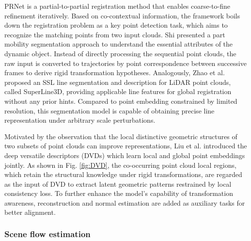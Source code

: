 \documentclass[a4paper,fleqn]{cas-dc}
\begin{document}
PRNet \citep{wang2019prnet} is a partial-to-partial registration method that enables coarse-to-fine refinement iteratively. Based on co-contextual information, the framework boils down the registration problem as a key point detection task, which aims to recognize the matching points from two input clouds. Shi \citep{wang2019prnet} presented a part mobility segmentation approach to understand the essential attributes of the dynamic object. Instead of directly processing the sequential point clouds, the raw input is converted to trajectories by point correspondence between successive frames to derive rigid transformation hypotheses. Analogously, Zhao et al. \citep{zhao2022superline3d} proposed an SSL line segmentation and description for LiDAR point clouds, called SuperLine3D, providing applicable line features for global registration without any prior hints. Compared to point embedding constrained by limited resolution, this segmentation model is capable of obtaining precise line representation under arbitrary scale perturbations. 

Motivated by the observation that the local distinctive geometric structures of two subsets of point clouds can improve representations, Liu et al. \citep{liu2022self} introduced the deep versatile descriptors (DVDs) which learn local and global point embeddings jointly. As shown in Fig. \ref{fig:DVD}, the co-occurring point cloud local regions, which retain the structural knowledge under rigid transformations, are regarded as the input of DVD to extract latent geometric patterns restrained by local consistency loss. To further enhance the model's capability of transformation awareness, reconstruction and normal estimation are added as auxiliary tasks for better alignment. 

\subsubsection{Scene flow estimation}
\end{document}
